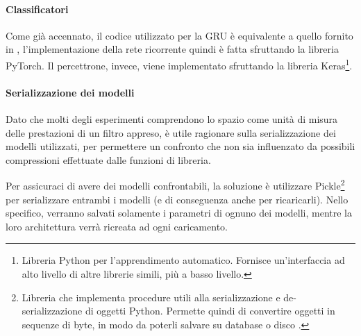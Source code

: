 \documentclass[../../main.tex]{subfiles}
\begin{document}
    \paragraph{Classificatori}
    Come già accennato, il codice utilizzato per la GRU è equivalente a quello fornito in \cite{ma2020}, l'implementazione della rete ricorrente quindi è fatta sfruttando la libreria PyTorch. Il percettrone, invece, viene implementato sfruttando la libreria Keras\footnote{Libreria Python per l'apprendimento automatico. Fornisce un'interfaccia ad alto livello di altre librerie simili, più a basso livello.}.

    \paragraph{Serializzazione dei modelli}
    Dato che molti degli esperimenti comprendono lo spazio come unità di misura delle prestazioni di un filtro appreso, è utile ragionare sulla serializzazione dei modelli utilizzati, per permettere un confronto che non sia influenzato da possibili compressioni effettuate dalle funzioni di libreria.

    Per assicuraci di avere dei modelli confrontabili, la soluzione è utilizzare Pickle\footnote{Libreria che implementa procedure utili alla serializzazione e de-serializzazione di oggetti Python. Permette quindi di convertire oggetti in sequenze di byte, in modo da poterli salvare su database o disco \cite{Pickle}.} per serializzare entrambi i modelli (e di conseguenza anche per ricaricarli). Nello specifico, verranno salvati solamente i parametri di ognuno dei modelli, mentre la loro architettura verrà ricreata ad ogni caricamento.
    
\end{document}
